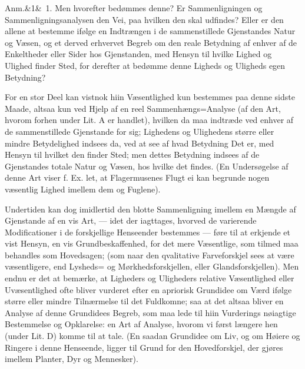 \documentclass[12pt]{book}
\makeatletter
\def\sperr#1{#1}%
\def\textit#1{#1}%
\def\emph#1{#1}%
\newcommand{\sperr}[1]{\textls[180]{#1}}
\newcommand{\umph}[2][misc]{%
  \@ifundefined{umph@#1@on}{#2}{\emph{#2}}}
\newcommand{\anm}[1]{%
  \par\vspace{0.5\baselineskip}%
  \noindent\hspace{\parindent}\sperr{Anm.}\ifx&#1&\else~\textit{#1}.\fi
  \enspace\ignorespaces
}
\newcommand{\opage}[1]{\marginnote{\footnotesize\textit{[#1]}}}
\makeatother
\begin{document}
\anm{1} Men hvorefter bedømmes denne? Er Sammenligningen og
Sammenligningsanalysen den Vei, paa hvilken den skal udfindes? Eller er den
allene at bestemme ifølge en \umph[schwab]{intellectuel} Indtrængen i de
sammenstillede Gjenstandes Natur og Væsen, og et derved erhvervet
\opage{196} Begreb om den reale Betydning af enhver af de Enkeltheder eller Sider hos
Gjenstanden, med Hensyn til hvilke Lighed og Ulighed finder Sted, for derefter at
bedømme denne Ligheds og Uligheds egen Betydning?

For en stor Deel kan vistnok hiin Væsentlighed kun bestemmes paa denne sidste
Maade, altsaa kun ved Hjelp af en reel Sammenhængs=Analyse (af den Art, hvorom
forhen under Lit. \textit{A} er handlet), hvilken da maa indtræde ved enhver af de
sammenstillede Gjenstande for sig; Lighedens og Ulighedens større eller mindre
Betydelighed indsees da, ved at see af hvad Betydning Det er, med Hensyn til
hvilket den finder Sted; men dettes Betydning indsees af de Gjenstandes totale
Natur og Væsen, hos hvilke det findes. (En Undersøgelse af denne Art viser f. Ex.
let, at Flagermusenes Flugt ei kan begrunde nogen væsentlig Lighed imellem dem og
Fuglene).

Undertiden kan dog imidlertid den blotte Sammenligning imellem en Mængde af
Gjenstande af en vis Art, --- idet der iagttages, hvorved de varierende
Modificationer i de forskjellige Henseender bestemmes --- føre til at erkjende et
vist Hensyn, en vis Grundbeskaffenhed, for det mere Væsentlige, som tilmed maa
behandles som Hovedsagen; (som naar den qvalitative Farveforskjel sees at være
væsentligere, end Lysheds= og Mørkhedsforskjellen, eller Glandsforskjellen).
\opage{197} Men endnu er det at bemærke, at Ligheders og Uligheders relative Væsentlighed
eller Uvæsentlighed ofte bliver vurderet efter en \emph{apriorisk} Grundidee om
Værd ifølge større eller mindre Tilnærmelse til det Fuldkomne; saa at det altsaa
bliver en Analyse af denne Grundidees Begreb, som maa lede til hiin Vurderings
nøiagtige Bestemmelse og Opklarelse: en Art af Analyse, hvorom vi først længere
hen (under Lit. \textit{D}) komme til at tale. (En saadan Grundidee om Liv, og om
Høiere og Ringere i denne Henseende, ligger til Grund for den Hovedforskjel, der
gjøres imellem Planter, Dyr og Mennesker).
\end{document}
